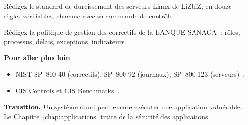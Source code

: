 \begin{boxexo}[title={\ding{45}\quad Exercice~18.9. Un standard de durcissement \niveauexpert}]
Rédigez le standard de durcissement des serveurs Linux de LiZbiZ, en douze
règles vérifiables, chacune avec sa commande de contrôle.
\end{boxexo}

\begin{boxexo}[title={\ding{45}\quad Exercice~18.10. La politique de correctifs \niveauexpert}]
Rédigez la politique de gestion des correctifs de la BANQUE SANAGA~: rôles,
processus, délais, exceptions, indicateurs.
\end{boxexo}

\bigskip

\begin{boxinfo}
\textbf{Pour aller plus loin.}
\begin{itemize}
    \item NIST SP~800-40 (correctifs), SP~800-92 (journaux), SP~800-123
          (serveurs)~\cite{nist80040,nist80092,nist800123}.
    \item CIS Controls et CIS Benchmarks~\cite{cis2021controls}.
\end{itemize}
\end{boxinfo}

\begin{boxinfo}
\textbf{Transition.} Un système durci peut encore exécuter une
application vulnérable. Le Chapitre~\ref{chap:applications} traite de la
sécurité des applications.
\end{boxinfo}
